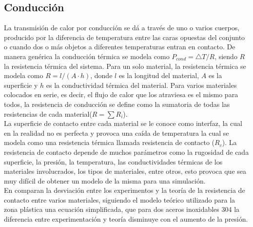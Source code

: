 \subsection{Conducción}
La transmisión de calor por conducción se dá a través de uno o varios cuerpos, producido por la diferencia de temperatura entre las caras opuestas del conjunto o cuando dos o más objetos a diferentes temperaturas entran en contacto. De manera genérica la conducción térmica se modela como $P_{cond}={\bigtriangleup T}/{R} $, siendo $R$ la resistencia térmica del sistema.
Para un solo material, la resistencia térmica se modela como $R = l/{\left(A\cdot h\right)}$, donde $l$ es la longitud del material, $A$ es la superficie y $h$ es la conductividad térmica del material. Para varios materiales colocados en serie, es decir, el flujo de calor que los atraviesa es el mismo para todos, la resistencia de conducción se define como la sumatoria de todas las resistencias de cada material($R=\sum R_i$).\\

La superficie de contacto entre cada material se le conoce como interfaz, la cual en la realidad no es perfecta y provoca una caída de temperatura la cual se modela como una resistencia térmica llamada resistencia de contacto ($R_c$). La resistencia de contacto depende de muchos parámetros como la rugosidad de cada superficie, la presión, la temperatura, las conductividades térmicas de los materiales involucrados, los tipos de materiales, entre otros, esto provoca que sea muy difícil de obtener un modelo de la misma para una simulación.\\

En \cite{experimental_Rc_SS} comparan la desviación entre los experimentos y la teoría de la resistencia de contacto entre varios materiales, siguiendo el modelo teórico utilizado para la zona plástica una ecuación simplificada, que para dos aceros inoxidables 304 la diferencia entre experimentación y teoría disminuye con el aumento de la presión.
